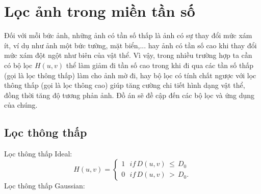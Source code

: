 \section{Lọc ảnh trong miền tần số}
Đối với mỗi bức ảnh, những ảnh có tần số thấp là ảnh có sự thay đổi mức xám ít, ví dụ như ảnh một bức tường, mặt biển,... hay ảnh có tần số cao khi thay đổi mức xám đột ngột như biên của vật thể. Vì vậy, trong nhiều trường hợp ta cần có bộ lọc $H(u,v)$ thể làm giảm đi tần số cao trong khi đi qua các tần số thấp (gọi là lọc thông thấp) làm cho ảnh mờ đi, hay bộ lọc có tính chất ngược với lọc thông thấp (gọi là lọc thông cao) giúp tăng cường chi tiết hình dạng vật thể, đồng thời tăng độ tương phản ảnh. Đồ án sẽ đề cập đến các bộ lọc và ứng dụng của chúng.
\subsection{Lọc thông thấp}
\par Lọc thông thấp Ideal:
$$H(u,v) = \left\{ {\begin{array}{*{20}{c}}
{1\,\,\,\,if\,D(u,v)\, \le \,{D_0}}\\
{0\,\,\,\,if\,D(u,v)\, > \,{D_0}.}
\end{array}} \right.$$
Lọc thông thấp Gaussian:

